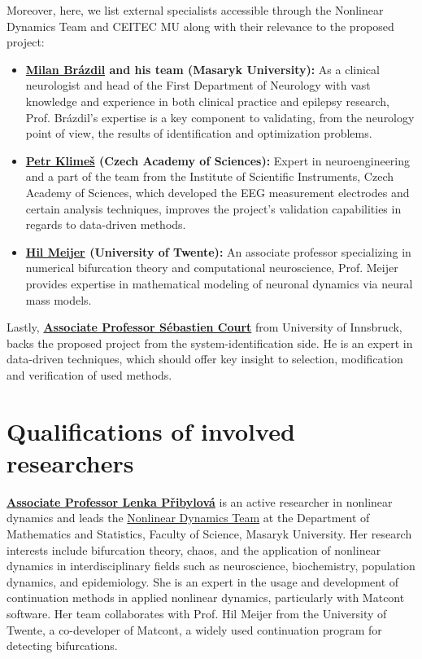 \documentclass[a4paper,11pt]{scrartcl}
\begin{document}
Moreover, here, we list external specialists accessible through the Nonlinear Dynamics Team and CEITEC MU along with their relevance to the proposed project:
\begin{itemize}
    \item \textbf{\href{https://orcid.org/0000-0001-7979-2343}{Milan Brázdil} and his team (Masaryk University):} As a clinical neurologist and head of the First Department of Neurology with vast knowledge and experience in both clinical practice and epilepsy research, Prof. Brázdil's expertise is a key component to validating, from the neurology point of view, the results of identification and optimization problems.
    \item \textbf{\href{https://orcid.org/0000-0002-0232-9518}{Petr Klimeš} (Czech Academy of Sciences):} Expert in neuroengineering and a part of the team from the Institute of Scientific Instruments, Czech Academy of Sciences, which developed the \ac{EEG} measurement electrodes and certain analysis techniques, improves the project's validation capabilities in regards to data-driven methods.
    \item \textbf{\href{https://orcid.org/0000-0003-1526-3762}{Hil Meijer} (University of Twente):} An associate professor specializing in numerical bifurcation theory and computational neuroscience, Prof. Meijer provides expertise in mathematical modeling of neuronal dynamics via neural mass models.
\end{itemize}

Lastly, \textbf{\href{https://orcid.org/0000-0003-0005-5223}{Associate Professor Sébastien Court}} from University of Innsbruck, backs the proposed project from the system-identification side. He is an expert in data-driven techniques, which should offer key insight to selection, modification and verification of used methods.

\section{Qualifications of involved researchers}\label{sec:qualifications}

\href{https://orcid.org/0000-0002-9027-4333}{\textbf{Associate Professor Lenka Přibylová}} is an active researcher in nonlinear dynamics and leads the \href{https://science.math.muni.cz/ndteam/}{Nonlinear Dynamics Team} at the Department of Mathematics and Statistics, Faculty of Science, Masaryk University. Her research interests include bifurcation theory, chaos, and the application of nonlinear dynamics in interdisciplinary fields such as neuroscience, biochemistry, population dynamics, and epidemiology. She is an expert in the usage and development of continuation methods in applied nonlinear dynamics, particularly with Matcont software. Her team collaborates with Prof. Hil Meijer from the University of Twente, a co-developer of Matcont, a widely used continuation program for detecting bifurcations.
\end{document}
